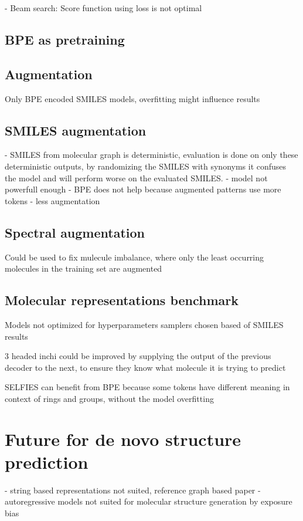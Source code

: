 - Beam search: Score function using loss is not optimal
\subsection{\ac{BPE} as pretraining}


\subsection{Augmentation}
Only BPE encoded SMILES models, overfitting might influence results

\subsection{SMILES augmentation}
- SMILES from molecular graph is deterministic, evaluation is done on only these deterministic outputs, by randomizing the SMILES with synonyms it confuses the model and will perform worse on the evaluated SMILES.
- model not powerfull enough
- BPE does not help because augmented patterns use more tokens
- less augmentation

\subsection{Spectral augmentation}

Could be used to fix mulecule imbalance, where only the least occurring molecules in the training set are augmented


\subsection{Molecular representations benchmark}

Models not optimized for hyperparameters
samplers chosen based of SMILES results

3 headed inchi could be improved by supplying the output of the previous decoder to the next, to ensure they know what molecule it is trying to predict

SELFIES can benefit from BPE because some tokens have different meaning in context of rings and groups, without the model overfitting

\section{Future for de novo structure prediction}

- string based representations not suited, reference graph based paper
- autoregressive models not suited for molecular structure generation by exposure bias